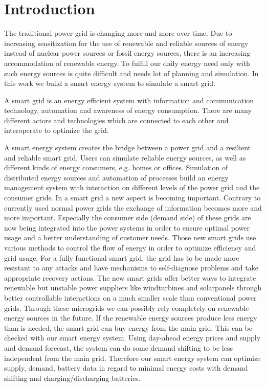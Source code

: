 \section{Introduction}

The traditional power grid is changing more and more over time.
Due to increasing sensitization for the use of renewable and reliable sources of energy instead of nuclear power sources or fossil energy sources, there is an increasing accommodation of renewable energy.
To fulfill our daily energy need only with such energy sources is quite difficult and needs lot of planning and simulation.
In this work we build a smart energy system to simulate a smart grid.

A smart grid is an energy efficient system with information and communication technology, automation and awareness of energy consumption.
There are many different actors and technologies which are connected to each other and interoperate to optimize the grid.

A smart energy system creates the bridge between a power grid and a resilient and reliable smart grid.
Users can simulate reliable energy sources, as well as different kinds of energy consumers, e.g. homes or offices.
Simulation of distributed energy sources and automation of processes build an energy management system with interaction on different levels of the power grid and the consumer grids.
In a smart grid a new aspect is becoming important.
Contrary to currently used normal power grids the exchange of information becomes more and more important.
Especially the consumer side (demand side) of these grids are now being integrated into the power systems in order to ensure optimal power usage and a better understanding of customer needs.
Those new smart grids use various methods to control the flow of energy in order to optimize efficiency and grid usage.
For a fully functional smart grid, the grid has to be made more resistant to any attacks and have mechanisms to self-diagnose problems and take appropriate recovery actions.
The new smart grids offer better ways to integrate renewable but unstable power suppliers like  windturbines and solarpanels through better controllable interactions on a much smaller scale than conventional power grids.
Through these microgrids we can possibly rely completely on renewable energy sources in the future.
If the renewable energy sources produce less energy than is needed, the smart grid can buy energy from the main grid.
This can be checked with our smart energy system.
Using day-ahead energy prices and supply and demand forecast, the system can do some demand shifting to be less independent from the main grid.
Therefore our smart energy system can optimize supply, demand, battery data in regard to minimal energy costs with demand shifting and charging/discharging batteries.



